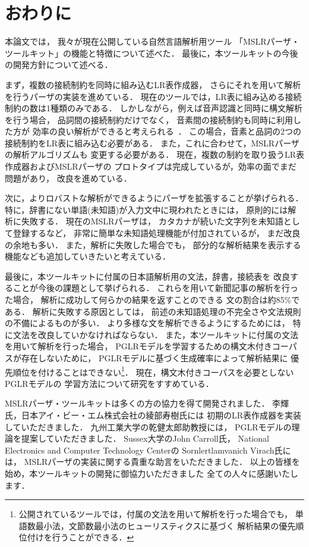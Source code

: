 \section{おわりに}
\label{sec:conclusion}

本論文では，
我々が現在公開している自然言語解析用ツール
「MSLRパーザ・ツールキット」の機能と特徴について述べた．
最後に，本ツールキットの今後の開発方針について述べる．

まず，複数の接続制約を同時に組み込むLR表作成器，
さらにそれを用いて解析を行うパーザの実装を進めている．
現在のツールでは，LR表に組み込める接続制約の数は1種類のみである．
しかしながら，例えば音声認識と同時に構文解析を行う場合，
品詞間の接続制約だけでなく，
音素間の接続制約も同時に利用した方が
効率の良い解析ができると考えられる~\cite{imai:99:a}．
この場合，音素と品詞の2つの接続制約をLR表に組み込む必要がある．
また，これに合わせて，MSLRパーザの解析アルゴリズムも
変更する必要がある．
現在，複数の制約を取り扱うLR表作成器およびMSLRパーザの
プロトタイプは完成しているが，効率の面でまだ問題があり，
改良を進めている．

次に，よりロバストな解析ができるようにパーザを拡張することが挙げられる．
特に，辞書にない単語(未知語)が入力文中に現われたときには，
原則的には解析に失敗する．
現在のMSLRパーザは，
カタカナが続いた文字列を未知語として登録するなど，
非常に簡単な未知語処理機能が付加されているが，
まだ改良の余地も多い．
また，解析に失敗した場合でも，
部分的な解析結果を表示する機能なども追加していきたいと考えている．

最後に，本ツールキットに付属の日本語解析用の文法，辞書，接続表を
改良することが今後の課題として挙げられる．
これらを用いて新聞記事の解析を行った場合，
解析に成功して何らかの結果を返すことのできる
文の割合は約85\%である．
解析に失敗する原因としては，
前述の未知語処理の不完全さや文法規則の不備によるものが多い．
より多様な文を解析できるようにするためには，
特に文法を改良していかなければならない．
また，本ツールキットに付属の文法を用いて解析を行った場合，
PGLRモデルを学習するための構文木付きコーパスが存在しないために，
PGLRモデルに基づく生成確率によって解析結果に
優先順位を付けることはできない\footnote{
  公開されているツールでは，付属の文法を用いて解析を行った場合でも，
  単語数最小法，文節数最小法のヒューリスティクスに基づく
  解析結果の優先順位付けを行うことができる．
}．
現在，構文木付きコーパスを必要としないPGLRモデルの
学習方法について研究をすすめている．

\medskip

\acknowledgment

MSLRパーザ・ツールキットは多くの方の協力を得て開発されました．
李輝氏，日本アイ・ビー・エム株式会社の綾部寿樹氏には
初期のLR表作成器を実装していただきました．
九州工業大学の乾健太郎助教授には，
PGLRモデルの理論を提案していただきました．
Sussex大学のJohn Carroll氏，
National Electronics and Computer Technology Centerの
Sornlertlamvanich Virach氏には，
MSLRパーザの実装に関する貴重な助言をいただきました．
以上の皆様を始め，本ツールキットの開発に御協力いただきました
全ての人々に感謝いたします．

